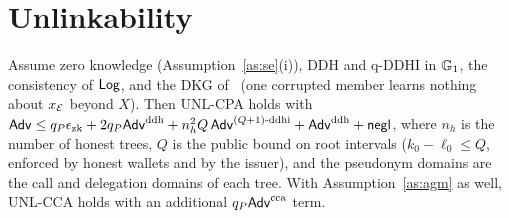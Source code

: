\section{Unlinkability}\label{s:unl}
\begin{theorem}\label{th:unl}
Assume zero knowledge (Assumption~\ref{as:se}(i)), DDH and q-DDHI in $\mathbb{G}_1$, the consistency of $\mathsf{Log}$, and the DKG of~\cite{gennaro2007dkg} (one corrupted member learns nothing about $x_{\mathcal{E}}$ beyond $X$). Then UNL-CPA holds with
$\mathsf{Adv}\le q_P\epsilon_{\mathrm{zk}}+2q_P\mathsf{Adv}^{\mathrm{ddh}}+n_h^2 Q\,\mathsf{Adv}^{(Q+1)\text{-ddhi}}+\mathsf{Adv}^{\mathrm{ddh}}+\mathsf{negl}$, where $n_h$ is the number of honest trees, $Q$ is the public bound on root intervals ($k_0-\ell_0\le Q$, enforced by honest wallets and by the issuer), and the pseudonym domains are the call and delegation domains of each tree. With Assumption~\ref{as:agm} as well, UNL-CCA holds with an additional $q_P\mathsf{Adv}^{\mathrm{cca}}$ term.
\end{theorem}
